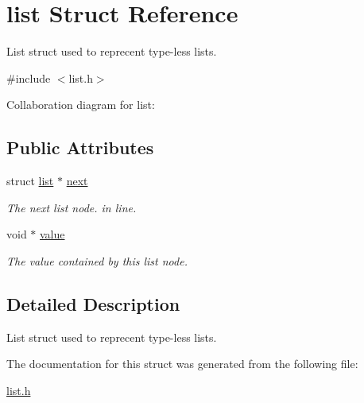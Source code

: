 \hypertarget{structlist}{}\section{list Struct Reference}
\label{structlist}


List struct used to reprecent type-\/less lists.  




{\ttfamily \#include $<$list.\+h$>$}



Collaboration diagram for list\+:
\subsection*{Public Attributes}
\begin{DoxyCompactItemize}
\item 
\mbox{\label{structlist_a1900fe79e875e2838625b2eb60837f8f}} 
struct \hyperlink{structlist}{list} $\ast$ \hyperlink{structlist_a1900fe79e875e2838625b2eb60837f8f}{next}
\begin{DoxyCompactList}\small\item\em The next list node. in line. \end{DoxyCompactList}\item 
\mbox{\label{structlist_a48ae9c7e6c08602f8b8b27355530adf2}} 
void $\ast$ \hyperlink{structlist_a48ae9c7e6c08602f8b8b27355530adf2}{value}
\begin{DoxyCompactList}\small\item\em The value contained by this list node. \end{DoxyCompactList}\end{DoxyCompactItemize}


\subsection{Detailed Description}
List struct used to reprecent type-\/less lists. 

The documentation for this struct was generated from the following file\+:\begin{DoxyCompactItemize}
\item 
\hyperlink{list_8h}{list.\+h}\end{DoxyCompactItemize}
